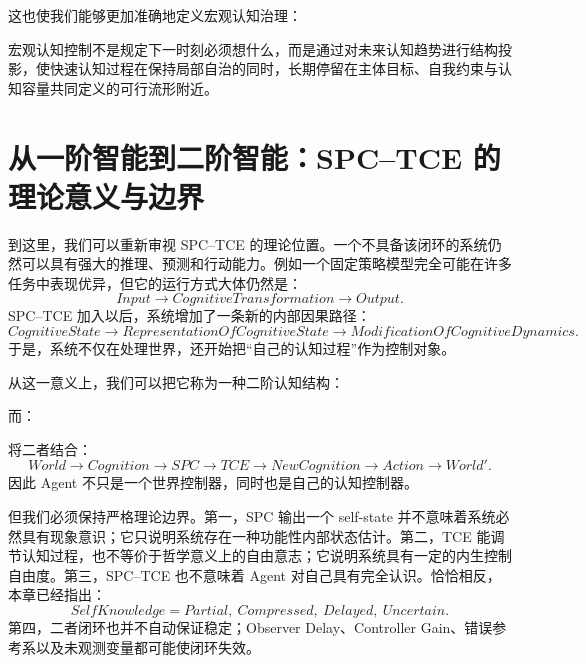 这也使我们能够更加准确地定义宏观认知治理：
\begin{definition*}
宏观认知控制不是规定下一时刻必须想什么，而是通过对未来认知趋势进行结构投影，使快速认知过程在保持局部自治的同时，长期停留在主体目标、自我约束与认知容量共同定义的可行流形附近。
\end{definition*}


\section{从一阶智能到二阶智能：SPC--TCE 的理论意义与边界}

到这里，我们可以重新审视 SPC--TCE 的理论位置。一个不具备该闭环的系统仍然可以具有强大的推理、预测和行动能力。例如一个固定策略模型完全可能在许多任务中表现优异，但它的运行方式大体仍然是：
\begin{equation}
Input
\rightarrow
CognitiveTransformation
\rightarrow
Output.
\end{equation}
SPC--TCE 加入以后，系统增加了一条新的内部因果路径：
\begin{equation}
CognitiveState
\rightarrow
RepresentationOfCognitiveState
\rightarrow
ModificationOfCognitiveDynamics.
\end{equation}
于是，系统不仅在处理世界，还开始把``自己的认知过程''作为控制对象。

从这一意义上，我们可以把它称为一种二阶认知结构：
\begin{statementbox}
\centering
{}
\end{statementbox}
而：
\begin{statementbox}
\centering
{}
\end{statementbox}

将二者结合：
\begin{equation}
World
\rightarrow
Cognition
\rightarrow
SPC
\rightarrow
TCE
\rightarrow
NewCognition
\rightarrow
Action
\rightarrow
World'.
\end{equation}
因此 Agent 不只是一个世界控制器，同时也是自己的认知控制器。

但我们必须保持严格理论边界。第一，SPC 输出一个 self-state 并不意味着系统必然具有现象意识；它只说明系统存在一种功能性内部状态估计。第二，TCE 能调节认知过程，也不等价于哲学意义上的自由意志；它说明系统具有一定的内生控制自由度。第三，SPC--TCE 也不意味着 Agent 对自己具有完全认识。恰恰相反，本章已经指出：
\begin{equation}
SelfKnowledge
=
Partial,\ Compressed,\ Delayed,\ Uncertain.
\end{equation}
第四，二者闭环也并不自动保证稳定；Observer Delay、Controller Gain、错误参考系以及未观测变量都可能使闭环失效。

